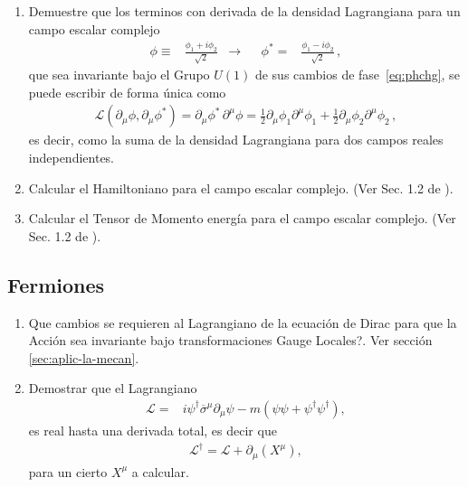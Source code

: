 \begin{enumerate}
\item  Demuestre que los terminos con derivada de la densidad Lagrangiana para un campo escalar complejo
\begin{align}
  \phi\equiv&\frac{\phi_1+i\phi_2}{\sqrt{2}} &\to&&   \phi^{*}=&\frac{\phi_1-i\phi_2}{\sqrt{2}}\,,
\end{align}
que sea invariante bajo el Grupo $U(1)$ de sus cambios de fase~\eqref{eq:phchg}, se puede escribir de forma única como
\begin{align}
  \mathcal{L}(\partial_{\mu} \phi,\partial_{\mu} \phi^{*})=  {\partial_\mu\phi^{*}}\,{\partial^\mu\phi}=\frac{1}{2}\partial_{\mu}\phi_1 \partial^{\mu}\phi_1+\frac{1}{2}\partial_{\mu}\phi_2 \partial^{\mu}\phi_2\,,
\end{align}
es decir, como la suma de la densidad Lagrangiana para dos campos reales independientes.

  
\item Calcular el Hamiltoniano para el campo escalar complejo. (Ver Sec. 1.2 de \cite{Greiner:1990tz}).
  
\item Calcular el Tensor de Momento energía para el campo escalar complejo. (Ver Sec. 1.2 de \cite{Greiner:1990tz}).
\end{enumerate}


\subsection{Fermiones}


\begin{enumerate}
 \item \textquestiondown Que cambios se requieren al Lagrangiano de la ecuaci\'on de Dirac para que la Acci\'on sea invariante bajo transformaciones Gauge Locales?. Ver secci\'on \ref{sec:aplic-la-mecan}.
 \item Demostrar que el Lagrangiano
   \begin{align*}
      \mathcal{L}=& i\psi^\dagger\overline{\sigma}^\mu\partial_\mu\psi -m \left( \psi\psi+\psi^{\dagger}\psi^{\dagger} \right),
   \end{align*}
 es real hasta una derivada total, es decir que
 \begin{align*}
   \mathcal{L}^\dagger = \mathcal{L}+\partial_\mu \left(X^\mu\right),
 \end{align*}
 para un cierto $X^\mu$ a calcular.

\label{item:pch1.3} %

\end{enumerate}


